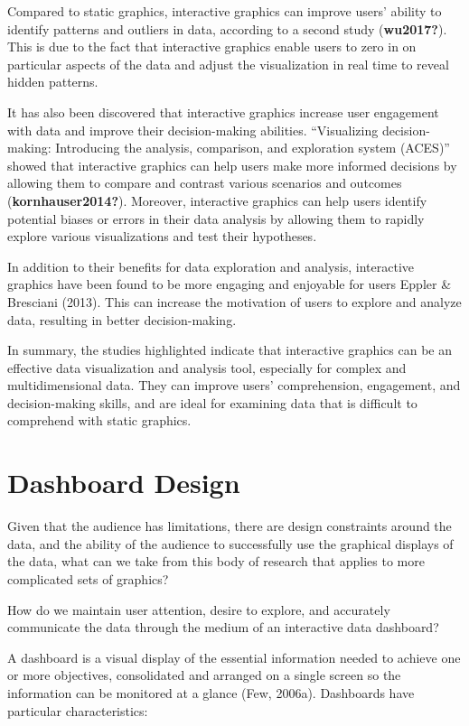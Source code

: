 \documentclass[print]{nuthesis}
\begin{document}
Compared to static graphics, interactive graphics can improve users' ability to identify patterns and outliers in data, according to a second study (\textbf{wu2017?}).
This is due to the fact that interactive graphics enable users to zero in on particular aspects of the data and adjust the visualization in real time to reveal hidden patterns.

It has also been discovered that interactive graphics increase user engagement with data and improve their decision-making abilities.
``Visualizing decision-making: Introducing the analysis, comparison, and exploration system (ACES)'' showed that interactive graphics can help users make more informed decisions by allowing them to compare and contrast various scenarios and outcomes (\textbf{kornhauser2014?}).
Moreover, interactive graphics can help users identify potential biases or errors in their data analysis by allowing them to rapidly explore various visualizations and test their hypotheses.

In addition to their benefits for data exploration and analysis, interactive graphics have been found to be more engaging and enjoyable for users Eppler \& Bresciani (2013).
This can increase the motivation of users to explore and analyze data, resulting in better decision-making.

In summary, the studies highlighted indicate that interactive graphics can be an effective data visualization and analysis tool, especially for complex and multidimensional data.
They can improve users' comprehension, engagement, and decision-making skills, and are ideal for examining data that is difficult to comprehend with static graphics.

\hypertarget{dashboard-design}{%
\section{Dashboard Design}\label{dashboard-design}}

Given that the audience has limitations, there are design constraints around the data, and the ability of the audience to successfully use the graphical displays of the data, what can we take from this body of research that applies to more complicated sets of graphics?

How do we maintain user attention, desire to explore, and accurately communicate the data through the medium of an interactive data dashboard?

A dashboard is a visual display of the essential information needed to achieve one or more objectives, consolidated and arranged on a single screen so the information can be monitored at a glance (Few, 2006a).
Dashboards have particular characteristics:
\end{document}
